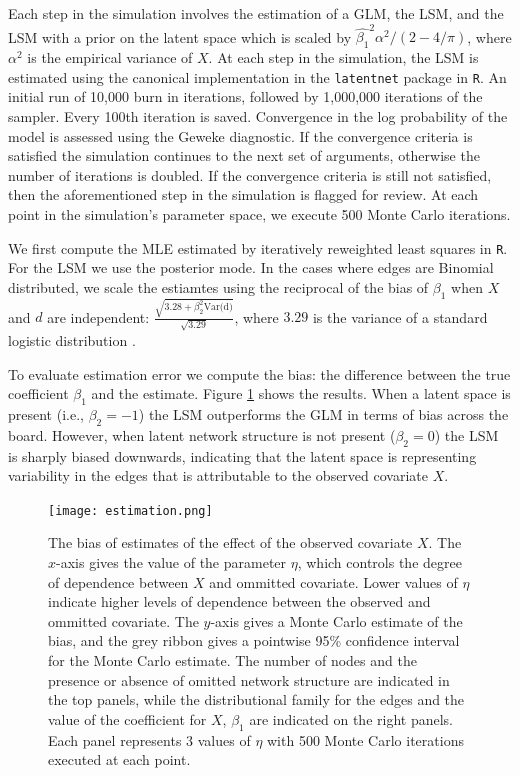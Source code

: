 \documentclass[12pt]{article}
\begin{document}
Each step in the simulation involves the estimation of a GLM, the LSM, and the LSM with a prior on the latent space which is scaled by $\hat{\beta_1}^2\alpha^2/(2-4/\pi)$, where $\alpha^2$ is the empirical variance of $X$. At each step in the simulation, the LSM is estimated using the canonical implementation in the \texttt{latentnet} package in \texttt{R}. An initial run of 10,000 burn in iterations, followed by 1,000,000 iterations of the sampler. Every 100th iteration is saved. Convergence in the log probability of the model is assessed using the Geweke diagnostic. If the convergence criteria is satisfied the simulation continues to the next set of arguments, otherwise the number of iterations is doubled. If the convergence criteria is still not satisfied, then the aforementioned step in the simulation is flagged for review. At each point in the simulation's parameter space, we execute 500 Monte Carlo iterations.

We first compute the MLE estimated by iteratively reweighted least squares in \texttt{R}. For the LSM we use the posterior mode. In the cases where edges are Binomial distributed, we scale the estiamtes using the reciprocal of the bias of $\beta_1$ when $X$ and $d$ are independent: $\frac{\sqrt{3.28 + \beta_2^2 \text{Var(d)}}}{\sqrt{3.29}}$, where $3.29$ is the variance of a standard logistic distribution \cite{mood2010logistic}.

To evaluate estimation error we compute the bias: the difference between the true coefficient $\beta_1$ and the estimate. Figure \ref{fig:estimation} shows the results. When a latent space is present (i.e., $\beta_2 = -1$) the LSM outperforms the GLM in terms of bias across the board. However, when latent network structure is not present ($\beta_2 = 0$) the LSM is sharply biased downwards, indicating that the latent space is representing variability in the edges that is attributable to the observed covariate $X$.

\begin{figure}
\texttt{[image: estimation.png]}
\caption{The bias of estimates of the effect of the observed covariate $X$. The $x$-axis gives the value of the parameter $\eta$, which controls the degree of dependence between $X$ and ommitted covariate. Lower values of $\eta$ indicate higher levels of dependence between the observed and ommitted covariate. The $y$-axis gives a Monte Carlo estimate of the bias, and the grey ribbon gives a pointwise 95\% confidence interval for the Monte Carlo estimate. The number of nodes and the presence or absence of omitted network structure are indicated in the top panels, while the distributional family for the edges and the value of the coefficient for $X$, $\beta_1$ are indicated on the right panels. Each panel represents 3 values of $\eta$ with 500 Monte Carlo iterations executed at each point.
\label{fig:estimation}}
\end{figure}
\end{document}
